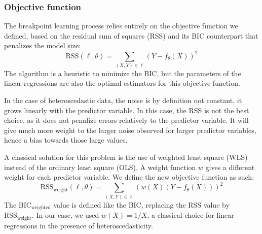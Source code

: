             \subsubsection{Objective function}%
                The breakpoint learning process relies entirely on the objective function we defined, based on the
                residual sum of squares (RSS) and its BIC counterpart that penalizes the model size:
                \begin{equation}
                    \text{RSS}(\ell, \theta) = \sum_{(X,Y)\in\ell} (Y-f_\theta(X))^2
                \end{equation}
                The algorithm is a heuristic to minimize the BIC, but the parameters of the linear regressions are
                also the optimal estimators for this objective function.

                In the case of heteroscedastic data, the noise is by definition not constant, it grows linearly with the
                predictor variable. In this case, the RSS is not the best choice, as it does not penalize errors
                relatively to the predictor variable. It will give much more weight to the larger noise observed for
                larger predictor variables, hence a bias towards those large values.

                A classical solution for this problem is the use of weighted least square (WLS) instead of the ordinary
                least square (OLS). A weight function \(w\) gives a different weight for each predictor variable. We
                define the new objective function as such:
                \begin{equation}
                    \text{RSS}_\text{weight}(\ell,\theta) = \sum_{(X,Y)\in\ell} (w(X)(Y - f_\theta(X)))^2
                \end{equation}
                The \(\text{BIC}_\text{weighted}\) value is defined like the BIC, replacing the RSS value by
                \(\text{RSS}_\text{weight}\).
                In our case, we used \(w(X) = 1/X\), a classical choice for linear regressions in the presence of
                heteroscedasticity.

